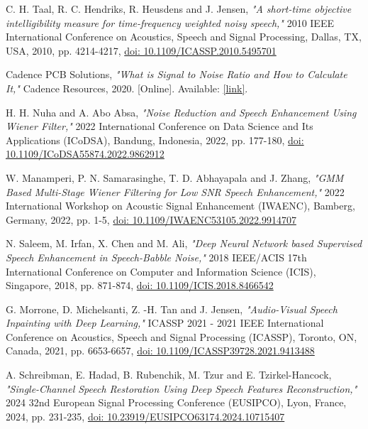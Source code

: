 \begin{thebibliography}{99}
    C. H. Taal, R. C. Hendriks, R. Heusdens and J. Jensen, \textit{"A short-time objective intelligibility measure for time-frequency weighted noisy speech,"} 2010 IEEE International Conference on Acoustics, Speech and Signal Processing, Dallas, TX, USA, 2010, pp. 4214-4217, \href{https://ieeexplore.ieee.org/document/5495701}{doi: 10.1109/ICASSP.2010.5495701} 

    
    Cadence PCB Solutions, \textit{"What is Signal to Noise Ratio and How to Calculate It,"} Cadence Resources, 2020. [Online]. Available: \href{https://resources.pcb.cadence.com/blog/2020-what-is-signal-to-noise-ratio-and-how-to-calculate-it}{[link]}.
    
    H. H. Nuha and A. Abo Absa, \textit{"Noise Reduction and Speech Enhancement Using Wiener Filter,"} 2022 International Conference on Data Science and Its Applications (ICoDSA), Bandung, Indonesia, 2022, pp. 177-180, \href{https://ieeexplore.ieee.org/document/9862912}{doi: 10.1109/ICoDSA55874.2022.9862912}

     W. Manamperi, P. N. Samarasinghe, T. D. Abhayapala and J. Zhang, \textit{"GMM Based Multi-Stage Wiener Filtering for Low SNR Speech Enhancement,"} 2022 International Workshop on Acoustic Signal Enhancement (IWAENC), Bamberg, Germany, 2022, pp. 1-5, \href{https://ieeexplore.ieee.org/document/9914707}{doi: 10.1109/IWAENC53105.2022.9914707}

    N. Saleem, M. Irfan, X. Chen and M. Ali, \textit{"Deep Neural Network based Supervised Speech Enhancement in Speech-Babble Noise,"} 2018 IEEE/ACIS 17th International Conference on Computer and Information Science (ICIS), Singapore, 2018, pp. 871-874, \href{https://ieeexplore.ieee.org/document/8466542}{doi: 10.1109/ICIS.2018.8466542}
    
    G. Morrone, D. Michelsanti, Z. -H. Tan and J. Jensen, \textit{"Audio-Visual Speech Inpainting with Deep Learning,"} ICASSP 2021 - 2021 IEEE International Conference on Acoustics, Speech and Signal Processing (ICASSP), Toronto, ON, Canada, 2021, pp. 6653-6657, \href{https://ieeexplore.ieee.org/document/9413488}{doi: 10.1109/ICASSP39728.2021.9413488}

    A. Schreibman, E. Hadad, B. Rubenchik, M. Tzur and E. Tzirkel-Hancock, \textit{"Single-Channel Speech Restoration Using Deep Speech Features Reconstruction,"} 2024 32nd European Signal Processing Conference (EUSIPCO), Lyon, France, 2024, pp. 231-235, \href{https://ieeexplore.ieee.org/document/10715407}{doi: 10.23919/EUSIPCO63174.2024.10715407}


\end{thebibliography}

